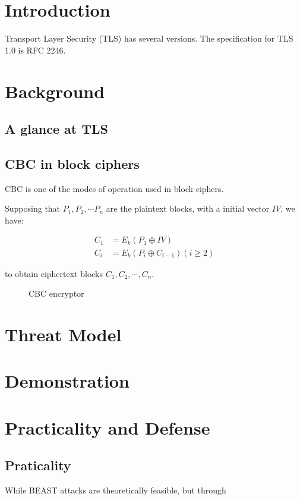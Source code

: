 \documentclass{acm_proc_article-sp}
\begin{document}
\section{Introduction}
Transport Layer Security (TLS) has several versions. The specification for TLS
1.0 is RFC 2246\cite{rfc2246}.

\section{Background}
\subsection{A glance at TLS}
\subsection{CBC in block ciphers}
CBC is one of the modes of operation used in block ciphers.

Supposing that $P_1,P_2,\cdots P_n$ are the plaintext blocks, with a initial vector $IV$, we have:

$$
\begin{aligned}
C_1&=E_k(P_1\oplus IV)\\
C_i&=E_k(P_{i}\oplus C_{i-1}) (i\geq 2)
\end{aligned}
$$

to obtain ciphertext blocks $C_1,C_2,\cdots,C_n$.

\begin{figure}[htb]
  \centering
  
  \caption{CBC encryptor}
\end{figure}
\section{Threat Model}

\section{Demonstration}
\section{Practicality and Defense}
\subsection{Praticality}
While BEAST attacks are theoretically feasible, but through
\end{document}
